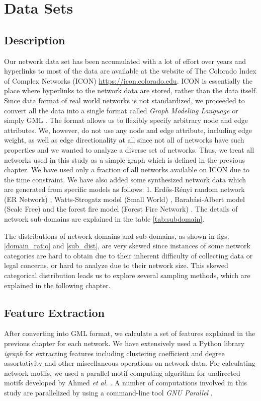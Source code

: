 \documentclass{article}
\begin{document}
\newpage
\section{Data Sets}
	\subsection{Description}	
	Our network data set has been accumulated with a lot of effort over years and hyperlinks to most of the data are available at the website of The Colorado Index of Complex Networks (ICON) \url{https://icon.colorado.edu}. ICON is essentially the place where hyperlinks to the network data are stored, rather than the data itself.  
	Since data format of real world networks is not standardized, we proceeded to convert all the data into a single format called \textit{Graph Modeling Language} or simply GML \cite{GML}. The format allows us to flexibly specify arbitrary node and edge attributes. We, however, do not use any node and edge attribute, including edge weight, as well as edge directionality at all since not all of networks have such properties and we wanted to analyze a diverse set of networks. Thus, we treat all networks used in this study as a simple graph which is defined in the previous chapter. We have used only a fraction of all networks available on ICON due to the time constraint. We have also added some synthesized network data which are generated from specific models as follows: 1. Erd\H{o}s-R\'enyi random network (ER Network) \cite{ER_Network}, Watts-Strogatz model (Small World) \cite{watts1998cds}, Barab\'asi-Albert model (Scale Free) \cite{Barabasi99emergenceScaling} and the forest fire model (Forest Fire Network) \cite{ForestFire}. The details of network sub-domains are explained in the table \ref{tab:subdomain}.
	
	The distributions of network domains and sub-domains, as shown in figs.\ref{domain_ratio} and \ref{sub_dist}, are very skewed since instances of some network categories are hard to obtain due to their inherent difficulty of collecting data or legal concerns, or hard to analyze due to their network size. This skewed categorical distribution leads us to explore several sampling methods, which are explained in the following chapter. 
	\subsection{Feature Extraction}
	After converting into GML format, we calculate a set of features explained in the previous chapter for each network. We have extensively used a Python library \textit{igraph} \cite{igraph} for extracting features including clustering coefficient and degree assortativity and other miscellaneous operations on network data. For calculating network motifs, we used a parallel motif computing algorithm for undirected motifs developed by Ahmed \textit{et al.} \cite{ahmed2015icdm}. A number of computations involved in this study are parallelized by using a command-line tool \textit{GNU Parallel} \cite{GNUParallel}.
\end{document}
